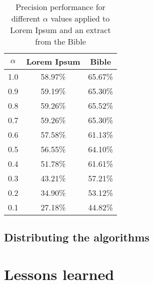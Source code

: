 \documentclass[a4paper,12pt]{article}
\begin{document}
 \begin{table}
    \centering
    \begin{tabular}{c || c  c}
      $\alpha$ & Lorem Ipsum & Bible \\\hline\hline
      1.0 & 58.97\% & 65.67\% \\\hline
      0.9 & 59.19\% & 65.30\% \\\hline
      0.8 & 59.26\% & 65.52\% \\\hline
      0.7 & 59.26\% & 65.30\% \\\hline
      0.6 & 57.58\% & 61.13\% \\\hline
      0.5 & 56.55\% & 64.10\% \\\hline
      0.4 & 51.78\% & 61.61\% \\\hline
      0.3 & 43.21\% & 57.21\% \\\hline
      0.2 & 34.90\% & 53.12\% \\\hline
      0.1 & 27.18\% & 44.82\%
    \end{tabular}
    \caption{\label{alpha} Precision performance for different $\alpha$ values applied to Lorem Ipsum and an extract from the Bible}
  \end{table}

  \subsection{Distributing the algorithms}

\section*{Lessons learned}



\end{document}
